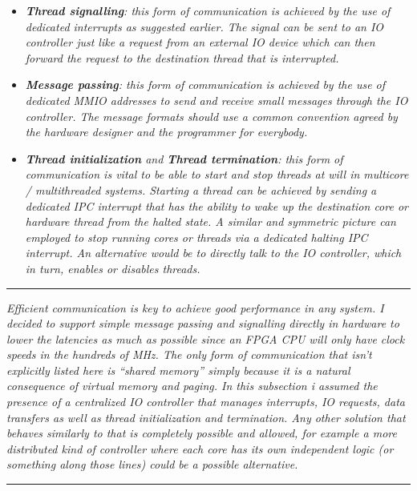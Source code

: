 \documentclass{article}
\begin{document}
            \begin{itemize}

                \item \textit{\textbf{Thread signalling}: this form of communication is achieved by the use of dedicated interrupts as suggested earlier. The signal can be sent to an IO controller just like a request from an external IO device which can then forward the request to the destination thread that is interrupted.}

                \item \textit{\textbf{Message passing}: this form of communication is achieved by the use of dedicated MMIO addresses to send and receive small messages through the IO controller. The message formats should use a common convention agreed by the hardware designer and the programmer for everybody.}

                \item \textit{\textbf{Thread initialization} and \textbf{Thread termination}: this form of communication is vital to be able to start and stop threads at will in multicore / multithreaded systems. Starting a thread can be achieved by sending a dedicated IPC interrupt that has the ability to wake up the destination core or hardware thread from the halted state. A similar and symmetric picture can employed to stop running cores or threads via a dedicated halting IPC interrupt. An alternative would be to directly talk to the IO controller, which in turn, enables or disables threads.}

            \end{itemize}

        \par\noindent\rule{\textwidth}{0.4pt}
        \textit{Efficient communication is key to achieve good performance in any system. I decided to support simple message passing and signalling directly in hardware to lower the latencies as much as possible since an FPGA CPU will only have clock speeds in the hundreds of MHz. The only form of communication that isn't explicitly listed here is ``shared memory'' simply because it is a natural consequence of virtual memory and paging. In this subsection i assumed the presence of a centralized IO controller that manages interrupts, IO requests, data transfers as well as thread initialization and termination. Any other solution that behaves similarly to that is completely possible and allowed, for example a more distributed kind of controller where each core has its own independent logic (or something along those lines) could be a possible alternative.}
        \par\noindent\rule{\textwidth}{0.4pt}
\end{document}
